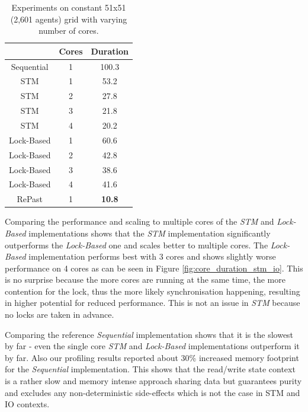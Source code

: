 \begin{table}
	\centering
  	\begin{tabular}{ c || c | c  }
                    & Cores & Duration  \\ \hline \hline 
    	Sequential  & 1     & 100.3     \\ \hline \hline
   		STM         & 1     & 53.2      \\ \hline
   		STM         & 2     & 27.8      \\ \hline
   		STM         & 3     & 21.8      \\ \hline
   		STM         & 4     & 20.2      \\ \hline \hline
   		Lock-Based  & 1     & 60.6      \\ \hline 
   		Lock-Based  & 2     & 42.8      \\ \hline 
   		Lock-Based  & 3     & 38.6      \\ \hline 
   		Lock-Based  & 4     & 41.6      \\ \hline \hline
   		RePast      & 1     & \textbf{10.8} \\ \hline \hline
  	\end{tabular}
  	
  	\caption{Experiments on constant 51x51 (2,601 agents) grid with varying number of cores.}
	\label{tab:constgrid_varyingcores}
\end{table}

Comparing the performance and scaling to multiple cores of the \textit{STM} and \textit{Lock-Based} implementations shows that the \textit{STM} implementation significantly outperforms the \textit{Lock-Based} one and scales better to multiple cores. The \textit{Lock-Based} implementation performs best with 3 cores and shows slightly worse performance on 4 cores as can be seen in Figure \ref{fig:core_duration_stm_io}. This is no surprise because the more cores are running at the same time, the more contention for the lock, thus the more likely synchronisation happening, resulting in higher potential for reduced performance. This is not an issue in \textit{STM} because no locks are taken in advance. 

Comparing the reference \textit{Sequential} implementation shows that it is the slowest by far - even the single core \textit{STM} and \textit{Lock-Based} implementations outperform it by far. Also our profiling results reported about 30\% increased memory footprint for the \textit{Sequential} implementation. This shows that the read/write state context is a rather slow and memory intense approach sharing data but guarantees purity and excludes any non-deterministic side-effects which is not the case in STM and IO contexts.

